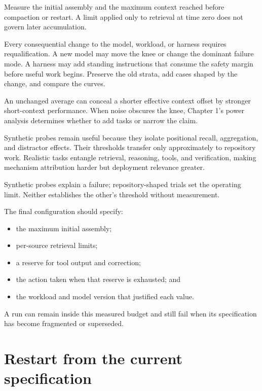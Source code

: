 Measure the initial assembly and the maximum context reached before compaction or restart. A limit applied only to retrieval at time zero does not govern later accumulation.

Every consequential change to the model, workload, or harness requires requalification. A new model may move the knee or change the dominant failure mode. A harness may add standing instructions that consume the safety margin before useful work begins. Preserve the old strata, add cases shaped by the change, and compare the curves.

An unchanged average can conceal a shorter effective context offset by stronger short-context performance. When noise obscures the knee, Chapter 1's power analysis determines whether to add tasks or narrow the claim.

Synthetic probes remain useful because they isolate positional recall, aggregation, and distractor effects. Their thresholds transfer only approximately to repository work. Realistic tasks entangle retrieval, reasoning, tools, and verification, making mechanism attribution harder but deployment relevance greater.

Synthetic probes explain a failure; repository-shaped trials set the operating limit. Neither establishes the other's threshold without measurement.


The final configuration should specify:

\begin{itemize}
\tightlist
\item
  the maximum initial assembly;
\item
  per-source retrieval limits;
\item
  a reserve for tool output and correction;
\item
  the action taken when that reserve is exhausted; and
\item
  the workload and model version that justified each value.
\end{itemize}

A run can remain inside this measured budget and still fail when its specification has become fragmented or superseded.

\hypertarget{restart-from-the-current-specification}{%
\section{Restart from the current specification}\label{restart-from-the-current-specification}}

